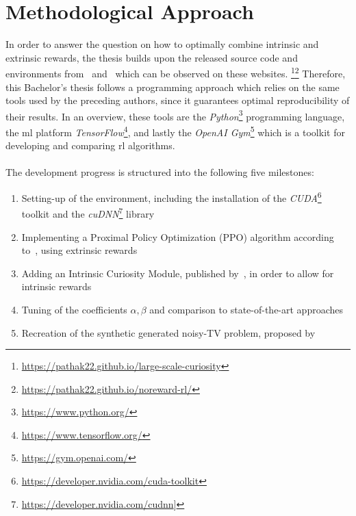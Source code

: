 \documentclass[draft,final]{vutinfth} %
\begin{document}
    \section{Methodological Approach}\label{sec:methodological-approach}
    In order to answer the question on how to optimally combine intrinsic and extrinsic rewards, the thesis builds upon the released source code and environments from~\cite{burda_large-scale_2018-1} and~\cite{pathak_curiosity-driven_2017-1} which can be observed on these websites. \footnote{\url{https://pathak22.github.io/large-scale-curiosity}}\footnote{\url{https://pathak22.github.io/noreward-rl/}}
    Therefore, this Bachelor's thesis follows a programming approach which relies on the same tools used by the preceding authors, since it guarantees optimal reproducibility of their results.
    In an overview, these tools are the \textit{Python}\footnote{\url{https://www.python.org/}} programming language, the \gls{ml} platform \textit{TensorFlow}\footnote{\url{https://www.tensorflow.org/}}, and lastly the \textit{OpenAI Gym}\footnote{\url{https://gym.openai.com/}} which is a toolkit for developing and comparing \gls{rl} algorithms.
    \\\\
    The development progress is structured into the following five milestones:

    \begin{enumerate}
        \item Setting-up of the environment, including the installation of the \textit{CUDA}\footnote{\url{https://developer.nvidia.com/cuda-toolkit}} toolkit and the \textit{cuDNN}\footnote{\url{https://developer.nvidia.com/cudnn}]} library
        \item Implementing a Proximal Policy Optimization (PPO) algorithm according to~\cite{schulman_proximal_2017}, using extrinsic rewards
        \item Adding an Intrinsic Curiosity Module, published by~\cite{pathak_curiosity-driven_2017-1}, in order to allow for intrinsic rewards
        \item Tuning of the coefficients $\alpha,\beta$ and comparison to state-of-the-art approaches
        \item Recreation of the synthetic generated noisy-TV problem, proposed by~\cite{burda_large-scale_2018-1}
    \end{enumerate}
\end{document}
